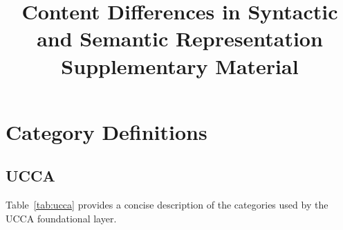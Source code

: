 \documentclass[11pt,a4paper]{article}
\title{Content Differences in Syntactic and Semantic Representation \\ Supplementary Material}
\date{}
\begin{document}
\maketitle

\vspace{-3cm}

\section{Category Definitions}\label{sec:definitions}

\subsection{UCCA}

Table~\ref{tab:ucca} provides a concise description of the
categories used by the UCCA foundational layer.
\end{document}
